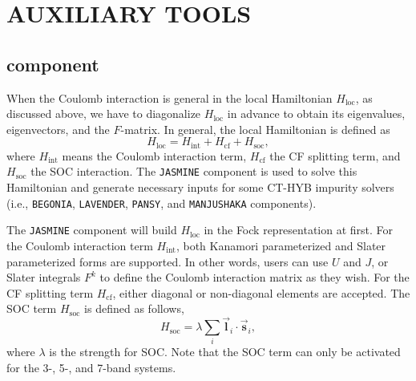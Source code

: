 \chapter{AUXILIARY TOOLS}
\section{{\jasmine} component}
When the Coulomb interaction is general in the local Hamiltonian $H_{\text{loc}}$, as discussed above, we have to diagonalize $H_{\text{loc}}$ in advance to obtain its eigenvalues, eigenvectors, and the $F$-matrix. In general, the local Hamiltonian is defined as
\begin{equation}
H_{\text{loc}} = H_{\text{int}} + H_{\text{cf}} + H_{\text{soc}},
\end{equation}
where $H_{\text{int}}$ means the Coulomb interaction term, $H_{\text{cf}}$ the CF splitting term, and $H_{\text{soc}}$ the SOC interaction. The \texttt{JASMINE} component is used to solve this Hamiltonian and generate necessary inputs for some CT-HYB impurity solvers (i.e., \texttt{BEGONIA}, \texttt{LAVENDER}, \texttt{PANSY}, and \texttt{MANJUSHAKA} components).

The \texttt{JASMINE} component will build $H_{\text{loc}}$ in the Fock representation at first. For the Coulomb interaction term $H_{\text{int}}$, both Kanamori parameterized and Slater parameterized forms are supported. In other words, users can use $U$ and $J$, or Slater integrals $F^{k}$ to define the Coulomb interaction matrix as they wish. For the CF splitting term $H_{\text{cf}}$, either diagonal or non-diagonal elements are accepted. The SOC term $H_{\text{soc}}$ is defined as follows,
\begin{equation}
H_{\text{soc}} = \lambda \sum_i \vec{\mathbf{l}}_i \cdot \vec{\mathbf{s}}_i,
\end{equation}
where $\lambda$ is the strength for SOC. Note that the SOC term can only be activated for the 3-, 5-, and 7-band systems.

